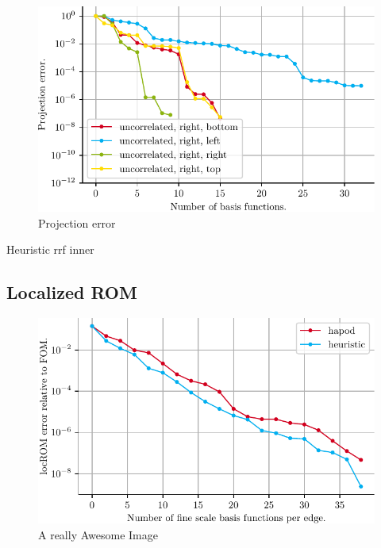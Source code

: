 \documentclass[a4paper]{eccomas_paper-2024}
\begin{document}
\begin{figure}[!htb]
\endminipage\hfill
{}%
  \includegraphics[width=\linewidth]{./figures/beam/fig_proj_error_right_heuristic.pdf}
  \caption{Projection error }\label{fig:proj_error_right_heuristic}
\endminipage
\end{figure}

\begin{table}
    \caption{Heuristic rrf inner}\label{tab:heuristic_inner}
    
\end{table}

\subsection{Localized ROM}

\begin{figure}[!htb]
    \includegraphics[width=\linewidth]{./figures/beam/fig_loc_rom_error.pdf}
    \caption{A really Awesome Image}\label{fig:loc_rom_error}
\end{figure}
\end{document}
